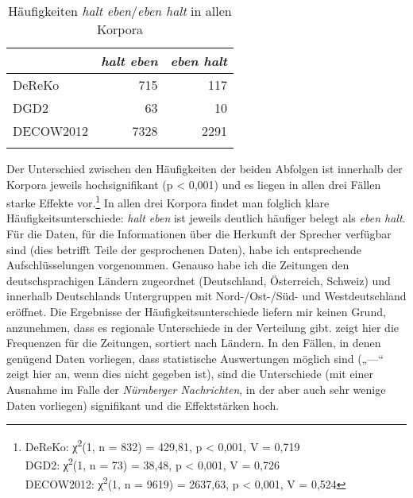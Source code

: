 \begin{table}
\caption{Häufigkeiten \textit{halt eben}/\textit{eben halt} in allen Korpora\label{tab:619}}
     \begin{tabular}{lrr}
     \lsptoprule
     & \textit{halt eben} & \textit{eben halt}\\
     \midrule
     DeReKo & 715 & 117\\
     DGD2 & 63 & 10\\
     DECOW2012 & 7328 & 2291\\\lspbottomrule
     \end{tabular}
\end{table}
Der Unterschied zwischen den Häufigkeiten der beiden Abfolgen ist innerhalb der Korpora jeweils hochsignifikant (p < 0,001) und es liegen in allen drei Fällen starke Effekte vor.\footnote{DeReKo: χ\textsuperscript{2}(1, n = 832) = 429,81, p < 0,001, V = 0,719\\
DGD2: χ\textsuperscript{2}(1, n = 73) = 38,48, p < 0,001, V = 0,726\\
DECOW2012: χ\textsuperscript{2}(1, n = 9619) = 2637,63, p < 0,001, V = 0,524} In allen drei Korpora findet man folglich klare Häufigkeits\-unterschiede: \textit{halt eben} ist jeweils deutlich häufiger belegt als \textit{eben halt}. Für die Daten, für die Informationen über die Herkunft der Sprecher verfügbar sind (dies betrifft Teile der gesprochenen Daten), habe ich entsprechende Aufschlüsselungen vorgenommen. Genauso habe ich die Zeitungen den deutschsprachigen Ländern zugeordnet (Deutschland, Österreich, Schweiz) und innerhalb Deutschlands Untergruppen mit Nord-/Ost-/Süd- und Westdeutschland eröffnet. Die Ergebnisse der Häufigkeitsunterschiede liefern mir keinen Grund, anzunehmen, dass es regionale Unterschiede in der Verteilung gibt.  zeigt hier die Frequenzen für die Zeitungen, sortiert nach Ländern. In den Fällen, in denen genügend Daten vorliegen, dass statistische Auswertungen möglich sind („---“ zeigt hier an, wenn dies nicht gegeben ist), sind die Unterschiede (mit einer Ausnahme im Falle der \textit{Nürnberger Nachrichten}, in der aber auch sehr wenige Daten vorliegen) signifikant und die Effektstärken hoch.

